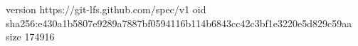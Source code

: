 version https://git-lfs.github.com/spec/v1
oid sha256:e430a1b5807e9289a7887bf0594116b114b6843cc42c3bf1e3220e5d829c59aa
size 174916
